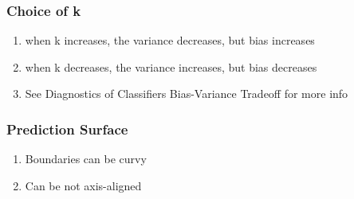 \documentclass[../../dsa1101_notes.Rtex]{subfiles}\usepackage[]{graphicx}\usepackage[]{color}
\begin{document}
\subsubsection{Choice of k}
\begin{enumerate}
    \item when k increases, the variance decreases, but bias increases
    \item when k decreases, the variance increases, but bias decreases
    \item See Diagnostics of Classifiers Bias-Variance Tradeoff for more info
\end{enumerate}

\subsubsection{Prediction Surface}
\begin{enumerate}
    \item Boundaries can be curvy
    \item Can be not axis-aligned
\end{enumerate}
\end{document}
